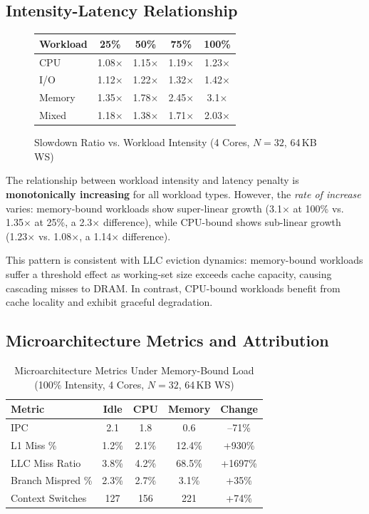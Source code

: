 \documentclass[conference]{IEEEtran}
\begin{document}
\subsection{Intensity-Latency Relationship}

\begin{figure}[h]
\centering
\begin{tabular}{lcccc}
\toprule
\textbf{Workload} & \textbf{25\%} & \textbf{50\%} & \textbf{75\%} & 
\textbf{100\%} \\
\midrule
CPU      & 1.08$\times$ & 1.15$\times$ & 1.19$\times$ & 1.23$\times$ \\
I/O      & 1.12$\times$ & 1.22$\times$ & 1.32$\times$ & 1.42$\times$ \\
Memory   & 1.35$\times$ & 1.78$\times$ & 2.45$\times$ & 3.1$\times$ \\
Mixed    & 1.18$\times$ & 1.38$\times$ & 1.71$\times$ & 2.03$\times$ \\
\bottomrule
\end{tabular}
\caption{Slowdown Ratio vs. Workload Intensity (4 Cores, $N=32$, 64\,KB WS)}
\label{tab:intensity}
\end{figure}

The relationship between workload intensity and latency penalty is
\textbf{monotonically increasing} for all workload types. However, the
\textit{rate of increase} varies: memory-bound workloads show super-linear
growth (3.1$\times$ at 100\% vs. 1.35$\times$ at 25\%, a 2.3$\times$ difference),
while CPU-bound shows sub-linear growth (1.23$\times$ vs. 1.08$\times$, a 1.14$\times$
difference).

This pattern is consistent with LLC eviction dynamics: memory-bound workloads
suffer a threshold effect as working-set size exceeds cache capacity, causing
cascading misses to DRAM. In contrast, CPU-bound workloads benefit from cache
locality and exhibit graceful degradation.

\subsection{Microarchitecture Metrics and Attribution}

\begin{table}[h]
\centering
\caption{Microarchitecture Metrics Under Memory-Bound Load (100\% Intensity,
         4 Cores, $N=32$, 64\,KB WS)}
\label{tab:microarch}
\begin{tabular}{lcccc}
\toprule
\textbf{Metric} & \textbf{Idle} & \textbf{CPU} & \textbf{Memory} &
\textbf{Change} \\
\midrule
IPC                & 2.1 & 1.8 & 0.6 & --71\% \\
L1 Miss \%         & 1.2\% & 2.1\% & 12.4\% & +930\% \\
LLC Miss Ratio     & 3.8\% & 4.2\% & 68.5\% & +1697\% \\
Branch Mispred \%  & 2.3\% & 2.7\% & 3.1\% & +35\% \\
Context Switches   & 127 & 156 & 221 & +74\% \\
\bottomrule
\end{tabular}
\end{table}
\end{document}
